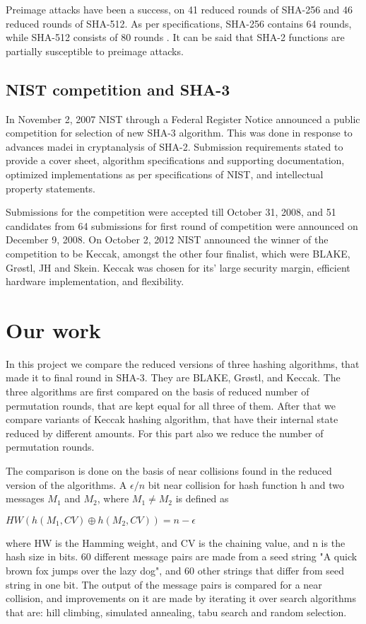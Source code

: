   Preimage attacks have been a success, on 41 reduced rounds of SHA-256 and 46 reduced rounds of SHA-512. 
  As per specifications, SHA-256 contains 64 rounds, while SHA-512 consists of 80 rounds \cite{00011}. It can be
  said that SHA-2 functions are partially susceptible to preimage attacks.

  \subsection{NIST competition and SHA-3}

  In November 2, 2007 NIST through a Federal Register Notice announced a public competition for selection of
  new SHA-3 algorithm. This was done in response to advances madei in cryptanalysis of SHA-2.
  Submission requirements stated to provide a cover sheet, algorithm specifications and supporting
  documentation, optimized implementations as per specifications of NIST, and intellectual property statements.

  Submissions for the competition were accepted till October 31, 2008, and 51 candidates from 64 submissions
  for first round of competition were announced on December 9, 2008. On October 2, 2012 NIST announced the 
  winner of the competition to be Keccak, amongst the other four finalist, which were BLAKE, Gr{\o}stl, JH
  and Skein. Keccak was chosen for its' large security margin, efficient hardware implementation, and 
  flexibility.
  
\section{Our work}

In this project we compare the reduced versions of three hashing algorithms, that made it to final round in SHA-3.
They are BLAKE, Gr{\o}stl, and Keccak. The three algorithms are first compared on the basis of reduced number of
permutation rounds, that are kept equal for all three of them. After that we compare variants of Keccak hashing
algorithm, that have their internal state reduced by different amounts. For this part also we reduce the number
of permutation rounds.

The comparison is done on the basis of near collisions found in the reduced version of the algorithms. A
$\epsilon / n $ bit near collision for hash function h and two messages $M_{1}$ and $M_{2}$, where 
$M_{1} \neq M_{2}$ is defined as
\begin{center}$ HW( h( M_{1}, CV ) \oplus h( M_{2}, CV ) ) = n - \epsilon $\end{center}
where HW is the Hamming weight, and CV is the chaining value, and n is the hash size in bits. 60 different message
pairs are made from a seed string "A quick brown fox jumps over the lazy dog", and 60 other strings that differ
from seed string in one bit. The output of the message pairs is compared for a near collision, and improvements
on it are made by iterating it over search algorithms that are: hill climbing, simulated annealing, tabu search 
and random selection.

